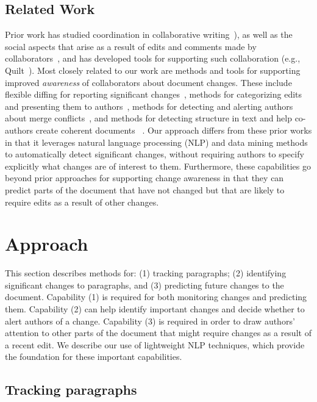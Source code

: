 \subsection{Related Work}\label{related-work}

Prior work has studied coordination in collaborative
writing~\cite[interalia]{neuwirth2001computer,kittur2007he}), as well as
the social aspects that arise as a result of edits and comments made by
collaborators~\cite{birnholtz2013write}, and has developed tools for
supporting such collaboration (e.g., Quilt~\cite{fish1988quilt}). Most
closely related to our work are methods and tools for supporting
improved \emph{awareness} of collaborators about document changes. These
include flexible diffing for reporting significant
changes~\cite{neuwirth1992flexible}, methods for categorizing edits and
presenting them to
authors~\cite{fong2010did,papadopoulou2007structured,tam2006framework},
methods for detecting and alerting authors about merge
conflicts~\cite{hainsworth2006enabling}, and methods for detecting
structure in text and help co-authors create coherent documents~
\cite{de2007narrative}. Our approach differs from these prior works in
that it leverages natural language processing (NLP) and data mining
methods to automatically detect significant changes, without requiring
authors to specify explicitly what changes are of interest to them.
Furthermore, these capabilities go beyond prior approaches for
supporting change awareness in that they can predict parts of the
document that have not changed but that are likely to require edits as a
result of other changes.

\section{Approach}\label{approach}

This section describes methods for: (1) tracking paragraphs; (2)
identifying significant changes to paragraphs, and (3) predicting future
changes to the document. Capability (1) is required for both monitoring
changes and predicting them. Capability (2) can help identify important
changes and decide whether to alert authors of a change. Capability (3)
is required in order to draw authors' attention to other parts of the
document that might require changes as a result of a recent edit. We
describe our use of lightweight NLP techniques, which provide the
foundation for these important capabilities.

\subsection{Tracking paragraphs}\label{tracking-paragraphs}

